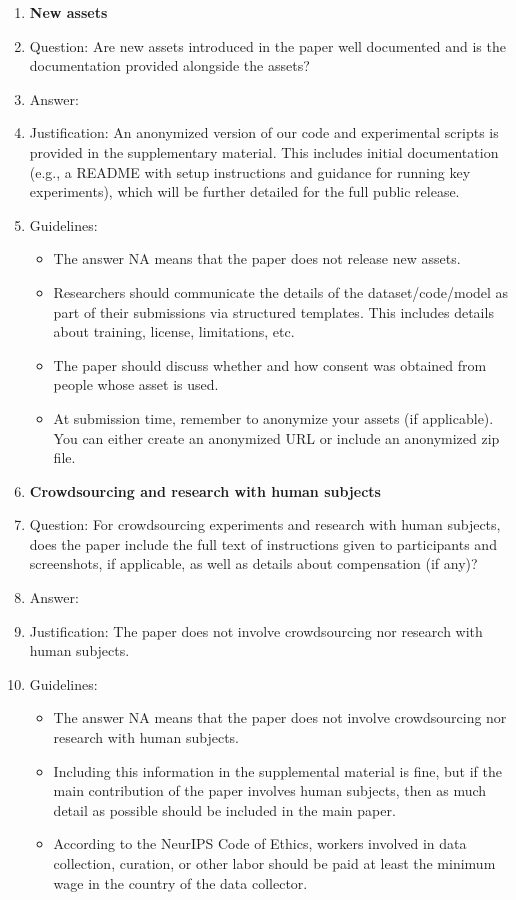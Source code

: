 \documentclass{article}
\theoremstyle{remark}
\begin{document}
\begin{enumerate}
\item {\bf New assets}
    \item[] Question: Are new assets introduced in the paper well documented and is the documentation provided alongside the assets?
    \item[] Answer: \answerYes{} %
    \item[] Justification: An anonymized version of our code and experimental scripts is provided in the supplementary material. This includes initial documentation (e.g., a README with setup instructions and guidance for running key experiments), which will be further detailed for the full public release.
    \item[] Guidelines:
    \begin{itemize}
        \item The answer NA means that the paper does not release new assets.
        \item Researchers should communicate the details of the dataset/code/model as part of their submissions via structured templates. This includes details about training, license, limitations, etc. 
        \item The paper should discuss whether and how consent was obtained from people whose asset is used.
        \item At submission time, remember to anonymize your assets (if applicable). You can either create an anonymized URL or include an anonymized zip file.
    \end{itemize}

\item {\bf Crowdsourcing and research with human subjects}
    \item[] Question: For crowdsourcing experiments and research with human subjects, does the paper include the full text of instructions given to participants and screenshots, if applicable, as well as details about compensation (if any)? 
    \item[] Answer: \answerNA{} %
    \item[] Justification: The paper does not involve crowdsourcing nor research with human subjects.
    \item[] Guidelines:
    \begin{itemize}
        \item The answer NA means that the paper does not involve crowdsourcing nor research with human subjects.
        \item Including this information in the supplemental material is fine, but if the main contribution of the paper involves human subjects, then as much detail as possible should be included in the main paper. 
        \item According to the NeurIPS Code of Ethics, workers involved in data collection, curation, or other labor should be paid at least the minimum wage in the country of the data collector. 
    \end{itemize}


\end{enumerate}
\end{document}

